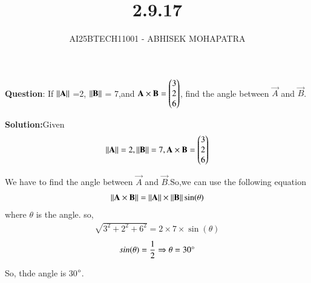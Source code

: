 \documentclass[journal,12pt,onecolumn]{IEEEtran}
\begin{document}
\title{2.9.17}
\author{AI25BTECH11001 - ABHISEK MOHAPATRA}
{\let\newpage\relax\maketitle}
	 	\textbf{Question}:
		If $\left\lVert\mathbf{A}\right\rVert$ =2, $\left\lVert\mathbf{B}\right\rVert$ = 7,and $\mathbf{A}\times\mathbf{B} = \begin{pmatrix}3\\2\\6\end{pmatrix}$, find the angle between $\vec{A}$ and $\vec{B}$.


		\textbf{Solution:}Given 
		\begin{align}
				\left\lVert\mathbf{A}\right\rVert =2, \left\lVert\mathbf{B}\right\rVert = 7, \mathbf{A}\times\mathbf{B} = \begin{pmatrix}3\\2\\6\end{pmatrix}
		\end{align}
		
		We have to find the angle between $\vec{A}$ and $\vec{B}$.So,we can use the following equation
		\begin{align}
				\left\lVert\mathbf{A}\times\mathbf{B}\right\rVert = \left\lVert\mathbf{A}\right\rVert\times\left\lVert\mathbf{B}\right\rVert\sin(\theta)
		\end{align}
		where $\theta$ is the angle.
		so,
		\begin{align}
			\sqrt{3^2+2^2+6^2} = 2 \times 7 \times \sin(\theta)	
		\end{align}
		\begin{align}
			sin(\theta) = \frac{1}{2} \Rightarrow \theta = 30\degree 
		\end{align}

		So, thde angle is 30$\degree$.
	
\end{document}
